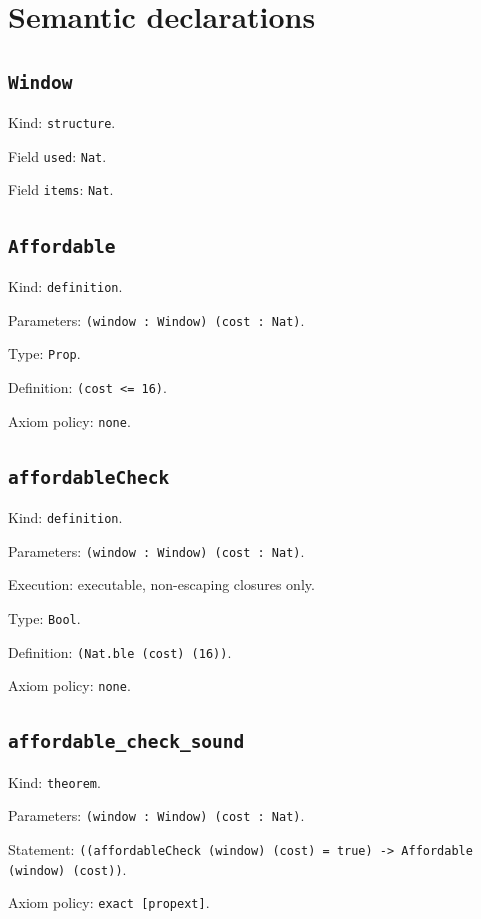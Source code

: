 \documentclass[11pt]{article}
\begin{document}
\section*{Semantic declarations}
\subsection*{\texttt{Window}}
\noindent Kind: \texttt{structure}.\par
\noindent Field \texttt{used}: \texttt{Nat}.\par
\noindent Field \texttt{items}: \texttt{Nat}.\par
\subsection*{\texttt{Affordable}}
\noindent Kind: \texttt{definition}.\par
\noindent Parameters: \texttt{(window : Window) (cost : Nat)}.\par
\noindent Type: \texttt{Prop}.\par
\noindent Definition: \texttt{(cost <= 16)}.\par
\noindent Axiom policy: \texttt{none}.\par
\subsection*{\texttt{affordableCheck}}
\noindent Kind: \texttt{definition}.\par
\noindent Parameters: \texttt{(window : Window) (cost : Nat)}.\par
\noindent Execution: executable, non-escaping closures only.\par
\noindent Type: \texttt{Bool}.\par
\noindent Definition: \texttt{(Nat.ble (cost) (16))}.\par
\noindent Axiom policy: \texttt{none}.\par
\subsection*{\texttt{affordable\_check\_sound}}
\noindent Kind: \texttt{theorem}.\par
\noindent Parameters: \texttt{(window : Window) (cost : Nat)}.\par
\noindent Statement: \texttt{((affordableCheck (window) (cost) = true) -> Affordable (window) (cost))}.\par
\noindent Axiom policy: \texttt{exact [propext]}.\par
\end{document}
